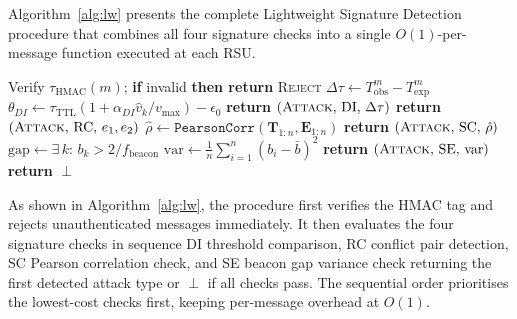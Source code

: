 Algorithm~\ref{alg:lw} presents the complete Lightweight
Signature Detection procedure that combines all four
signature checks into a single $O(1)$-per-message function
executed at each RSU.

\begin{algorithm}[H]
\caption{Lightweight Signature Detection (\texttt{LW-SigDet})}
\label{alg:lw}
\begin{algorithmic}[1]
\small
{}
  \State Verify $\tau_{\mathrm{HMAC}}(m)$; \textbf{if} invalid
    \textbf{then return} \textsc{Reject}
  \State $\Delta\tau \gets T_{\mathrm{obs}}^m - T_{\mathrm{exp}}^m$
  \State $\theta_{DI} \gets \tau_{\mathrm{TTL}}
    (1+\alpha_{DI}\hat{v}_k/v_{\max})-\epsilon_0$
    \State \textbf{return} $(\textsc{Attack},\,\mathrm{DI},\,\Delta\tau)$
  \EndIf
      \State \textbf{return} $(\textsc{Attack},\,\mathrm{RC},\,e_1,e_2)$
    \EndIf
  \EndFor
  \State $\hat{\rho} \gets
    \texttt{PearsonCorr}(\mathbf{T}_{1:n},\mathbf{E}_{1:n})$
    \State \textbf{return} $(\textsc{Attack},\,\mathrm{SC},\,\hat{\rho})$
  \EndIf
  \State $\mathrm{gap}\gets
    \exists\,k:\,b_k > 2/f_{\mathrm{beacon}}$
  \State $\mathrm{var}\gets
    \frac{1}{n}\sum_{i=1}^{n}(b_i-\bar{b})^2$
    \State \textbf{return}
      $(\textsc{Attack},\,\mathrm{SE},\,\mathrm{var})$
  \EndIf
  \State \textbf{return} $\perp$
\EndProcedure
\end{algorithmic}
\end{algorithm}

As shown in Algorithm~\ref{alg:lw}, the procedure first
verifies the HMAC tag and rejects unauthenticated messages
immediately. It then evaluates the four signature checks in
sequence  DI threshold comparison, RC conflict pair
detection, SC Pearson correlation check, and SE beacon gap
variance check  returning the first detected attack type
or $\perp$ if all checks pass. The sequential order
prioritises the lowest-cost checks first, keeping
per-message overhead at $O(1)$.

